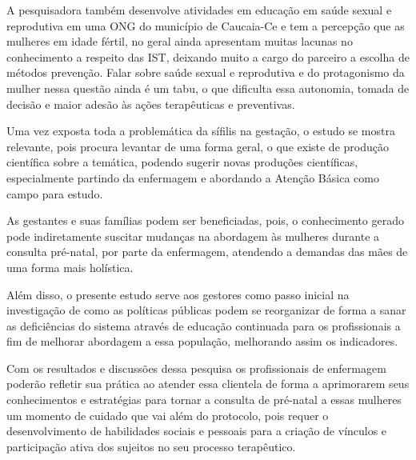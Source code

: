 A pesquisadora também desenvolve atividades em educação em saúde sexual e reprodutiva em uma \acrshort{ONG} do município de Caucaia-Ce e tem a percepção que as mulheres em idade fértil, no geral ainda apresentam muitas lacunas no conhecimento a respeito das IST, deixando muito a cargo do parceiro a escolha de métodos prevenção. Falar sobre saúde sexual e reprodutiva e do protagonismo da mulher nessa questão ainda é um tabu, o que dificulta essa autonomia, tomada de decisão e maior adesão às ações terapêuticas e preventivas.

Uma vez exposta toda a problemática da sífilis na gestação, o estudo se mostra relevante, pois procura levantar de uma forma geral, o que existe de produção científica sobre a temática, podendo sugerir novas produções científicas, especialmente partindo da enfermagem e abordando a Atenção Básica como campo para estudo. 

As gestantes e suas famílias podem ser beneficiadas, pois, o conhecimento gerado pode indiretamente suscitar mudanças na abordagem às mulheres durante a consulta pré-natal, por parte da enfermagem, atendendo a demandas das mães de uma forma mais holística.

Além disso, o presente estudo serve aos gestores como passo inicial na investigação de como as políticas públicas podem se reorganizar de forma a sanar as deficiências do sistema através de educação continuada para os profissionais a fim de melhorar abordagem a essa população, melhorando assim os indicadores.

Com os resultados e discussões dessa pesquisa os profissionais de enfermagem poderão refletir sua prática ao atender essa clientela de forma a aprimorarem seus conhecimentos e estratégias para tornar a consulta de pré-natal a essas mulheres um momento de cuidado que vai além do protocolo, pois requer o desenvolvimento de habilidades sociais e pessoais para a criação de vínculos e participação ativa dos sujeitos no seu processo terapêutico.




